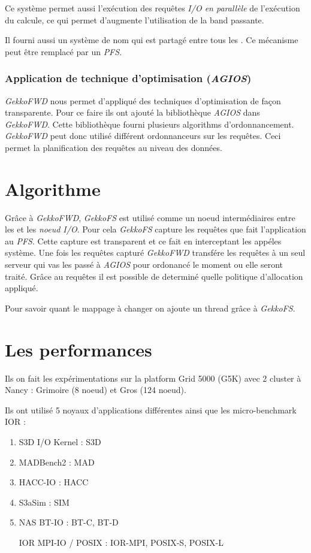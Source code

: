 \documentclass[10pt, a4paper]{article}
\begin{document}
Ce système permet aussi l'exécution des requêtes \emph{I/O en parallèle} de l'exécution du calcule, ce qui permet d'augmente l'utilisation de la band passante.

Il fourni aussi un système de nom qui est partagé entre tous les \noeudsDeCalculs{}. Ce mécanisme peut être remplacé par un \emph{PFS}.

\subsubsection{Application de technique d'optimisation (\emph{AGIOS})}

\emph{GekkoFWD} nous permet d'appliqué des techniques d'optimisation de façon transparente. Pour ce faire ils ont ajouté la bibliothèque \emph{AGIOS} dans \emph{GekkoFWD}. Cette bibliothèque fourni plusieurs algorithms d'ordonnancement.
\emph{GekkoFWD} peut donc utilisé différent ordonnanceurs sur les requêtes. Ceci permet la planification des requêtes au niveau des données.

\section{Algorithme}

Grâce à \emph{GekkoFWD}, \emph{GekkoFS} est utilisé comme un noeud intermédiaires entre les \noeudsDeCalculs{} et les \emph{noeud I/O}. Pour cela \emph{GekkoFS} capture les requêtes que fait l'application au \emph{PFS}. Cette capture est transparent et ce fait en interceptant les appéles système. Une fois les requêtes capturé \emph{GekkoFWD} transfére les requêtes à un seul serveur qui vas les passé à \emph{AGIOS} pour ordonancé le moment ou elle seront traité. Grâce au requêtes il est possible de determiné quelle politique d'allocation appliqué.

Pour savoir quant le mappage à changer on ajoute un thread grâce à \emph{GekkoFS}.

\section{Les performances}

Ils on fait les expérimentations sur la platform Grid 5000 (G5K) avec 2 cluster à Nancy : Grimoire (8 noeud) et Gros (124 noeud).

Ils ont utilisé 5 noyaux d'applications différentes ainsi que les micro-benchmark IOR :
\begin{enumerate}
  \item S3D I/O Kernel : S3D
  \item MADBench2 : MAD
  \item HACC-IO : HACC
  \item S3aSim : SIM
  \item NAS BT-IO : BT-C, BT-D
  \item [IOR] MPI-IO / POSIX : IOR-MPI, POSIX-S, POSIX-L
\end{enumerate}
\end{document}
